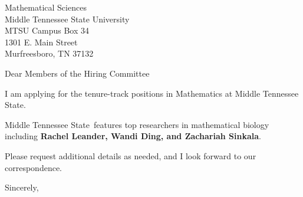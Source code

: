 




	
	
	\def\School{Middle Tennessee State}
	
	\begin{letter}
		{Mathematical Sciences\\
			Middle Tennessee State University\\
			MTSU Campus Box 34\\
			1301 E. Main Street\\
			Murfreesboro, TN 37132
		}
		
		\opening{Dear Members of the Hiring Committee}
		
		
		I am applying for the tenure-track positions in Mathematics at \School. 
		
		
		\School~features top researchers in mathematical biology including \textbf{Rachel Leander, Wandi Ding, and Zachariah Sinkala}. 
		
		
		
		
		
		Please request additional details as needed, and I look forward to our correspondence.
		
		\closing{Sincerely,}
	\end{letter}
